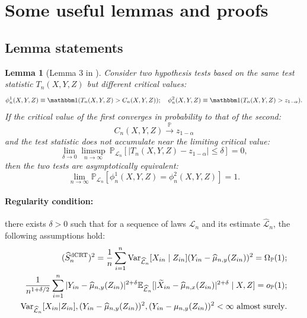 \documentclass[12pt]{article}
\newtheorem{lemma}{Lemma}
\theoremstyle{definition}
\def\P{\mathbb{P}}
\def\P{\mathbb{P}}
\newcommand{\E}{\mathbb E}								%
\newcommand{\V}{\mathrm{Var}}							%
\renewcommand{\P}{\mathbb{P}}							%
\newcommand{\indicator}{\mathbbm 1}						%
\newcommand{\convp}{\overset{\mathbb{P}}{\rightarrow}}             %
\newcommand{\srx}{X}									%
\newcommand{\srz}{Z}									%
\newcommand{\srxk}{\widetilde X}						%
\newcommand{\sry}{Y}									%
\newcommand{\law}{\mathcal L}							%
\newcommand{\lawhat}{\widehat{\mathcal L}}				%
\newcommand{\dCRT}{\textnormal{dCRT}} 					%
\begin{document}
\section{Some useful lemmas and proofs}\label{sec:useful_lemma}

\subsection{Lemma statements}

\begin{lemma}[Lemma 3 in \cite{Niu2022a}]\label{lem:unified_asymptotic_equivalence}
	Consider two hypothesis tests based on the same test statistic $T_n(\srx, \sry, \srz)$ but different critical values:
	\begin{equation*}
		\phi_n^1(\srx, \sry, \srz) \equiv \indicator(T_n(\srx, \sry, \srz) > C_n(\srx, \sry, \srz)); \quad \phi_n^2(\srx, \sry, \srz) \equiv \indicator(T_n(\srx, \sry, \srz) > z_{1-\alpha}). 
	\end{equation*}
	If the critical value of the first converges in probability to that of the second:
	\begin{equation*}
		C_n(\srx, \sry, \srz) \convp z_{1-\alpha}
	\end{equation*}
	and the test statistic does not accumulate near the limiting critical value:
	\begin{equation}
		\lim_{\delta \rightarrow 0}\limsup_{n \rightarrow \infty}\ \P_{\law_n}[|T_n(\srx, \sry, \srz)-z_{1-\alpha}| \leq \delta] = 0,
		\label{eq:non-accumulation-app}
	\end{equation}
	then the two tests are asymptotically equivalent:
	\begin{equation*}
		\lim_{n \rightarrow \infty}\P_{\law_n}[\phi_n^{1}(\srx, \sry, \srz) = \phi_n^2(\srx, \sry, \srz)] = 1.
	\end{equation*}
\end{lemma}


\paragraph{\textbf{Regularity condition:}}
there exists $\delta>0$ such that for a sequence of laws $\law_n$ and its estimate $\lawhat_n$, the following assumptions hold:
\begin{align}
    (\widehat{S}_n^{\dCRT})^2=\frac{1}{n}\sum_{i=1}^n\V_{\lawhat_n}[\srx_{in}\mid \srz_{in}](\sry_{in}-\widehat{\mu}_{n,y}(\srz_{in}))^2=\Omega_\P(1) \label{eq:variance_lower_bound};\\
    \frac{1}{n^{1+\delta/2}} \sum_{i=1}^n |\sry_{in}-\widehat \mu_{n,y}(\srz_{in})|^{2+\delta}\E_{\lawhat_n}[|\srxk_{in}-\widehat\mu_{n,x}(\srz_{in})|^{2+\delta}\mid \srx,\srz] =o_\P(1)\label{eq:Lyapunov_condition_2};\\
    \V_{\lawhat_n}[\srx_{in}|\srz_{in}],(\sry_{in}-\widehat{\mu}_{n,y}(\srz_{in}))^2,(\sry_{in}-\mu_{n,y}(\srz_{in}))^2<\infty\ \text{almost surely}\label{eq:non_degeneracy}.
\end{align}
\end{document}
